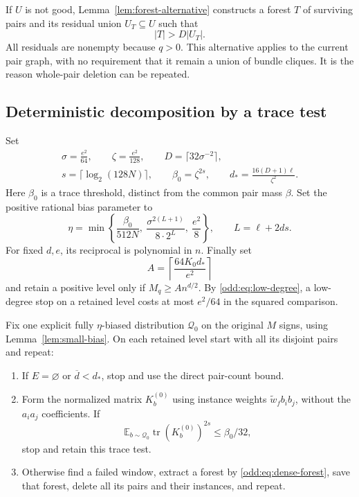 \documentclass[letterpaper,11pt]{article}
\theoremstyle{definition}
\newcommand{\E}{\mathbb E}
\begin{document}
If $U$ is not good, Lemma~\ref{lem:forest-alternative} constructs a
forest $T$ of surviving pairs and its residual union $U_T\subseteq U$
such that
\begin{equation}\label{odd:eq:dense-forest}
 |T|>D|U_T|.
\end{equation}
All residuals are nonempty because $q>0$.  This alternative applies to
the current pair graph, with no requirement that it remain a union of
bundle cliques.  It is the reason whole-pair deletion can be repeated.

\subsection{Deterministic decomposition by a trace test}

Set
\begin{equation}\label{odd:eq:trace-constants}
 \begin{gathered}
 \sigma=\frac{e^2}{64},\qquad \zeta=\frac{e^2}{128},\qquad
 D=\lceil32\sigma^{-2}\rceil,\\
 s=\lceil\log_2(128N)\rceil,\qquad
 \beta_0=\zeta^{2s},\qquad
 d_* =\frac{16(D+1)\ell}{\zeta^2}.
 \end{gathered}
\end{equation}
Here $\beta_0$ is a trace threshold, distinct from the common pair mass
$\beta$.  Set the positive rational bias parameter to
\begin{equation}\label{odd:eq:bias}
 \eta=\min\left\{
 \frac{\beta_0}{512N},\
 \frac{\sigma^{2(L+1)}}{8\cdot2^L},\
 \frac{e^2}{8}\right\},\qquad L=\ell+2ds.
\end{equation}
For fixed $d,e$, its reciprocal is polynomial in $n$.
Finally set
\begin{equation}\label{odd:eq:retained-threshold}
 A=\left\lceil\frac{64K_0d_*}{e^2}\right\rceil
\end{equation}
and retain a positive level only if $M_q\geq An^{d/2}$.  By
\eqref{odd:eq:low-degree}, a low-degree stop on a retained level costs
at most $e^2/64$ in the squared comparison.

Fix one explicit fully $\eta$-biased distribution $\mathcal Q_0$ on the
original $M$ signs, using Lemma~\ref{lem:small-bias}.  On each retained
level start with all its disjoint pairs and repeat:
\begin{enumerate}
\item If $E=\varnothing$ or $\overline d<d_*$, stop and use the direct
      pair-count bound.
\item Form the normalized matrix $K_b^{(0)}$ using instance weights
      $\widetilde w_fb_ib_j$, without the $a_i a_j$ coefficients.  If
      \begin{equation}\label{odd:eq:trace-stop}
       \E_{b\sim\mathcal Q_0}\operatorname{tr}
                   (K_b^{(0)})^{2s}\leq\beta_0/32,
      \end{equation}
      stop and retain this trace test.
\item Otherwise find a failed window, extract a forest by
      \eqref{odd:eq:dense-forest}, save that forest, delete all its
      pairs and their instances, and repeat.
\end{enumerate}
\end{document}
